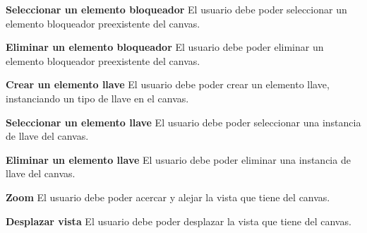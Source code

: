 	\item \textbf{Seleccionar un elemento bloqueador}\newline
		El usuario debe poder seleccionar un elemento bloqueador preexistente del canvas.
	\item \textbf{Eliminar un elemento bloqueador}\newline
		El usuario debe poder eliminar un elemento bloqueador preexistente del canvas.
	\item \textbf{Crear un elemento llave}\newline
		El usuario debe poder crear un elemento llave, instanciando un tipo de llave en el canvas.
	\item \textbf{Seleccionar un elemento llave}\newline
		El usuario debe poder seleccionar una instancia de llave del canvas.
	\item \textbf{Eliminar un elemento llave}\newline
		El usuario debe poder eliminar una instancia de llave del canvas.
	\item \textbf{Zoom}\newline
		El usuario debe poder acercar y alejar la vista que tiene del canvas.
	\item \textbf{Desplazar vista}\newline
		El usuario debe poder desplazar la vista que tiene del canvas.
